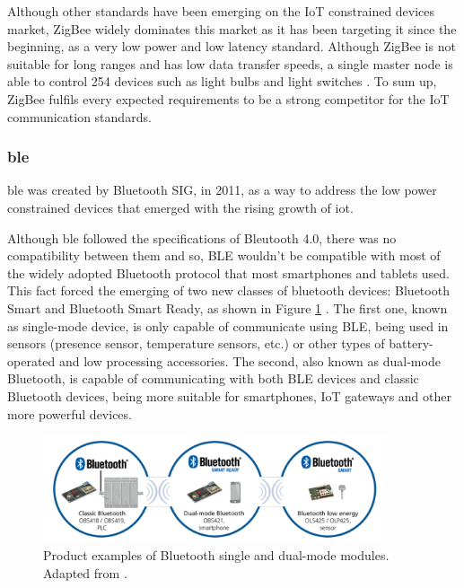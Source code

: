 Although other standards have been emerging on the IoT constrained devices market, ZigBee widely dominates this market as it has been targeting it since the beginning, as a very low power and low latency standard.
Although ZigBee is not suitable for long ranges and has low data transfer speeds, a single master node is able to control 254 devices such as light bulbs and light switches \cite{Mehboob2016}. 
To sum up, ZigBee fulfils every expected requirements to be a strong competitor for the IoT communication standards.

\subsubsection{\acf{ble}}

\acf{ble} was created by Bluetooth SIG, in 2011, as a way to address the low power constrained devices that emerged with the rising growth of \ac{iot}. 


Although \ac{ble} followed the specifications of Bleutooth 4.0, there was no compatibility between them and so, BLE wouldn't be compatible with most of the widely adopted Bluetooth protocol that most smartphones and tablets used. This fact forced the emerging of two new classes of bluetooth devices: Bluetooth Smart and Bluetooth Smart Ready, as shown in Figure \ref{fig:ble1} \cite{Andersson2014}. The first one, known as single-mode device, is only capable of communicate using BLE, being used in sensors (presence sensor, temperature sensors, etc.) or other types of battery-operated and low processing accessories. The second, also known as dual-mode Bluetooth, is capable of communicating with both BLE devices and classic Bluetooth devices, being more suitable for smartphones, IoT gateways and other more powerful devices. 

\begin{figure}[H]
	\centering
	\includegraphics[width=0.9\textwidth]{figures/ble.png}
	\caption{Product examples of Bluetooth single and dual-mode modules. Adapted from \cite{Andersson2014}.}
	\label{fig:ble1}
\end{figure}

